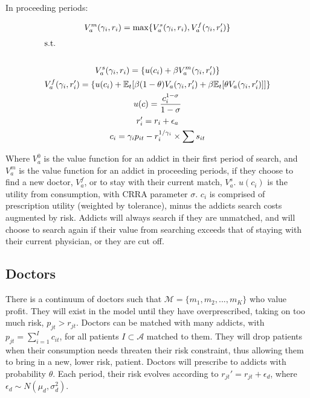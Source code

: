 \documentclass[11pt,a4paper]{article}
\begin{document}
In proceeding periods:

\begin{equation}
  V_a^m(\gamma_i, r_i) = \max\{V_a^s(\gamma_i, r_i), V_a^f(\gamma_i, r_i')\} \\
\end{equation}
\begin{gather*}
  \shortintertext{s.t.} \\
  V_a^s(\gamma_i, r_i) = \{u(c_i) + \beta V_a^m(\gamma_i, r_i')\} \\
  V_a^f(\gamma_i, r_i') = \{u(c_i) + \mathbb{E}_{t}[\beta(1-\theta)V_a(\gamma_i, r_i') + \beta \mathbb{E}_{t}[\theta V_a(\gamma_i, r_i')]]\} \\
  u(c) = \frac{c_i^{1-\sigma}}{1-\sigma} \\
  r_i' = r_i + \epsilon_a \\
  c_i =\gamma_ip_{it} - r_i^{1/\gamma_i} \times \sum s_{it}
\end{gather*}

Where $V_a^0$ is the value function for an addict in their first period of search, and $V_a^m$ is the value function for an addict in proceeding periods, if they choose
to find a new doctor, $V_a^f$, or to stay with their current match, $V_a^s$. $u(c_i)$ is the utility from consumption, with CRRA parameter $\sigma$. $c_i$ is comprised 
of prescription utility (weighted by tolerance), minus the addicts search costs augmented by risk. Addicts will always search if they are unmatched, and will choose
to search again if their value from searching exceeds that of staying with their current physician, or they are cut off.

\subsection{Doctors}

There is a continuum of doctors such that $\mathcal{M} = \{m_1, m_2, ..., m_K\}$ who value profit. They will exist in the model until they have overprescribed,
taking on too much risk, $p_{jt} > r_{jt}$. Doctors can be matched with many addicts, with $p_{jt} = \sum\limits_{i = 1}^{I} c_{it}$, for all patients $I \subset \mathcal{A}$
matched to them. They will drop patients when their consumption needs threaten their risk constraint, thus allowing them to bring in a new, lower risk, patient. Doctors
will prescribe to addicts with probability $\theta$. Each period, their risk evolves according to
$r_{jt}' = r_{jt} + \epsilon_{d}$, where $\epsilon_{d} \sim N(\mu_d, \sigma_d^2)$.
\end{document}
